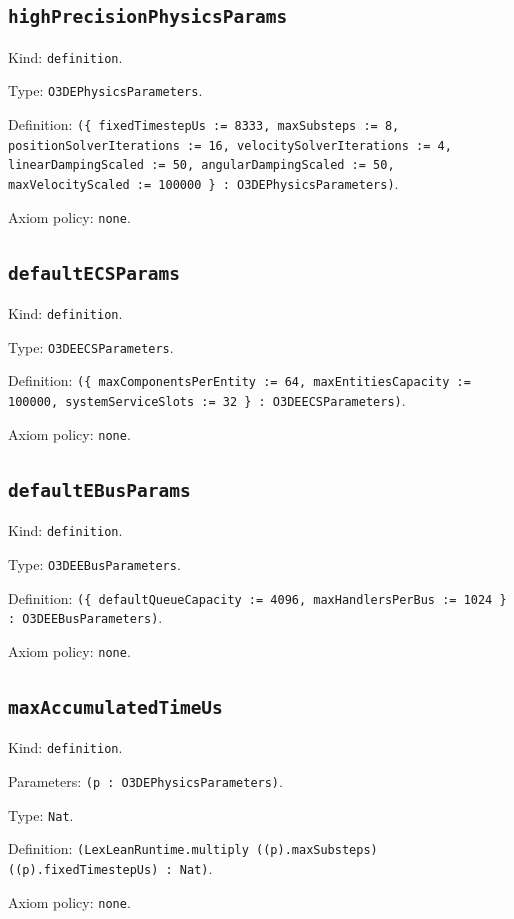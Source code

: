 \documentclass[11pt]{article}
\begin{document}
\subsection*{\texttt{highPrecisionPhysicsParams}}
\noindent Kind: \texttt{definition}.\par
\noindent Type: \texttt{O3DEPhysicsParameters}.\par
\noindent Definition: \texttt{(\{ fixedTimestepUs := 8333, maxSubsteps := 8, positionSolverIterations := 16, velocitySolverIterations := 4, linearDampingScaled := 50, angularDampingScaled := 50, maxVelocityScaled := 100000 \} : O3DEPhysicsParameters)}.\par
\noindent Axiom policy: \texttt{none}.\par
\subsection*{\texttt{defaultECSParams}}
\noindent Kind: \texttt{definition}.\par
\noindent Type: \texttt{O3DEECSParameters}.\par
\noindent Definition: \texttt{(\{ maxComponentsPerEntity := 64, maxEntitiesCapacity := 100000, systemServiceSlots := 32 \} : O3DEECSParameters)}.\par
\noindent Axiom policy: \texttt{none}.\par
\subsection*{\texttt{defaultEBusParams}}
\noindent Kind: \texttt{definition}.\par
\noindent Type: \texttt{O3DEEBusParameters}.\par
\noindent Definition: \texttt{(\{ defaultQueueCapacity := 4096, maxHandlersPerBus := 1024 \} : O3DEEBusParameters)}.\par
\noindent Axiom policy: \texttt{none}.\par
\subsection*{\texttt{maxAccumulatedTimeUs}}
\noindent Kind: \texttt{definition}.\par
\noindent Parameters: \texttt{(p : O3DEPhysicsParameters)}.\par
\noindent Type: \texttt{Nat}.\par
\noindent Definition: \texttt{(LexLeanRuntime.multiply ((p).maxSubsteps) ((p).fixedTimestepUs) : Nat)}.\par
\noindent Axiom policy: \texttt{none}.\par
\end{document}

